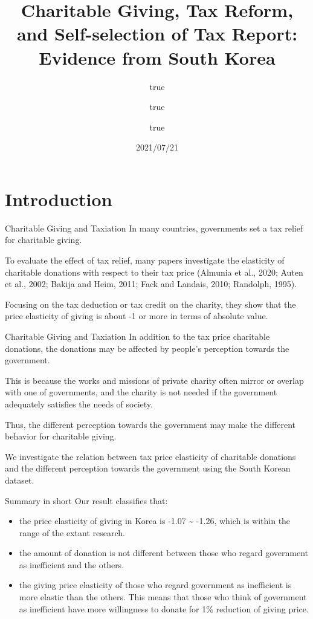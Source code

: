 \documentclass[
  ignorenonframetext,
  aspectratio=169]{beamer}
\title{Charitable Giving, Tax Reform, and Self-selection of Tax Report: Evidence from South Korea}
\author{true \and true \and true}
\date{2021/07/21}
\providecommand{\tightlist}{%
  \setlength{\itemsep}{0pt}\setlength{\parskip}{0pt}}
\begin{document}
\frame{\titlepage}

\hypertarget{introduction}{%
\section{Introduction}\label{introduction}}

\begin{frame}{Charitable Giving and Taxiation}
\protect\hypertarget{charitable-giving-and-taxiation}{}
In many countries, governments set a tax relief for charitable giving.

To evaluate the effect of tax relief, many papers investigate the elasticity of charitable donations with respect to their tax price (Almunia et al., 2020; Auten et al., 2002; Bakija and Heim, 2011; Fack and Landais, 2010; Randolph, 1995).

Focusing on the tax deduction or tax credit on the charity, they show that the price elasticity of giving is about -1 or more in terms of absolute value.
\end{frame}

\begin{frame}{Charitable Giving and Taxiation}
\protect\hypertarget{charitable-giving-and-taxiation-1}{}
In addition to the tax price charitable donations, the donations may be affected by people's perception towards the government.

This is because the works and missions of private charity often mirror or overlap with one of governments, and the charity is not needed if the government adequately satisfies the needs of society.

Thus, the different perception towards the government may make the different behavior for charitable giving.

We investigate the relation between tax price elasticity of charitable donations and the different perception towards the government using the South Korean dataset.
\end{frame}

\begin{frame}{Summary in short}
\protect\hypertarget{summary-in-short}{}
Our result classifies that:

\begin{itemize}
\tightlist
\item
  the price elasticity of giving in Korea is -1.07 \textasciitilde{} -1.26, which is within the range of the extant research.
\item
  the amount of donation is not different between those who regard government as inefficient and the others.
\item
  the giving price elasticity of those who regard government as inefficient is more elastic than the others. This means that those who think of government as inefficient have more willingness to donate for 1\% reduction of giving price.
\end{itemize}
\end{frame}
\end{document}
